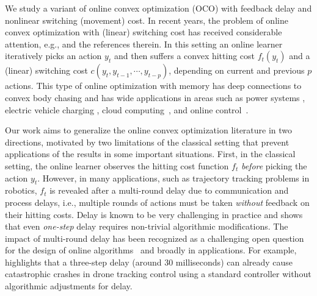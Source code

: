 We study a variant of online convex optimization (OCO) with feedback delay and nonlinear switching (movement) cost. In recent years, the problem of online convex optimization with (linear) switching cost has received considerable attention, e.g., \citep{bansal_et_al:LIPIcs:2015:5297,10.1007/978-3-319-89441-6_13,10.1145/2796314.2745854,shi2020online,goel2019beyond} and the references therein.  In this setting an online learner iteratively picks an action $y_t$ and then suffers a convex hitting cost $f_t(y_t)$ and a (linear) switching cost $c(y_t,y_{t-1},\cdots,y_{t-p})$, depending on current and previous $p$ actions. This type of online optimization with memory has deep connections to convex body chasing \citep{bubeck2019competitively,argue2020chasing,sellke2020chasing,bubeck2020chasing} and has wide applications in areas such as power systems \citep{badiei2015online,kim2016online,li2018using}, electric vehicle charging \citep{chen2012iems,kim2016online}, cloud computing~\cite{liu2014pricing,chen2016using,10.1145/2796314.2745854}, and online control~\citep{goel2019online,li2019online,shi2020online,li2020online,lin2021perturbation}. 

Our work aims to generalize the online convex optimization literature in two directions, motivated by two limitations of the classical setting that prevent applications of the results in some important situations.  First, in the classical setting, the online learner observes the hitting cost function $f_t$ \textit{before} picking the action $y_t$. However, in many applications, such as trajectory tracking problems in robotics, $f_t$ is revealed after a multi-round delay due to communication and process delays, i.e., multiple rounds of actions must be taken \textit{without} feedback on their hitting costs. Delay is known to be very challenging in practice and \cite{shi2020online} shows that even \textit{one-step} delay requires non-trivial algorithmic modifications. The impact of multi-round delay has been recognized as a challenging open question for the design of online algorithms~\citep{shi2020online,joulani2013online,shamir2017online} and broadly in applications. For example, \cite{shi2021neural} highlights that a three-step delay (around $30$ milliseconds) can already cause catastrophic crashes in drone tracking control using a standard controller without algorithmic adjustments for delay. 

